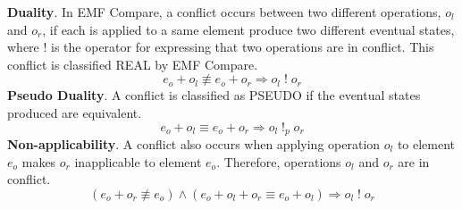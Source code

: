 \textbf{Duality}. In EMF Compare, a conflict occurs between two different operations, $o_{l}$ and $o_{r}$, if each is applied to a same element produce two different eventual states, where $!$ is the operator for expressing that two operations are in conflict. This conflict is classified \textsf{REAL} by EMF Compare.
\begin{equation} \label{eq:conflict_1.8}
e_{o} + o_{l} \not\equiv e_{o} + o_{r} \Rightarrow o_{l}\;!\;o_{r}
\end{equation} 
\textbf{Pseudo Duality}. A conflict is classified as \textsf{PSEUDO} if the eventual states produced are equivalent. 
\begin{equation} \label{eq:conflict_1.9}
e_{o} + o_{l} \equiv e_{o} + o_{r} \Rightarrow o_{l}\;!_{p}\;o_{r}
\end{equation} 
\textbf{Non-applicability}. A conflict also occurs when applying operation $o_{l}$ to element $e_{o}$ makes $o_{r}$ inapplicable to element $e_{o}$. Therefore, operations $o_{l}$ and $o_{r}$ are in conflict. 
\begin{equation} \label{eq:conflict_1.10}
(e_{o} + o_{r} \not\equiv e_{o}) \wedge (e_{o} + o_{l} + o_{r} \equiv e_{o} + o_{l}) \Rightarrow o_{l}\;!\;o_{r}
\end{equation}

